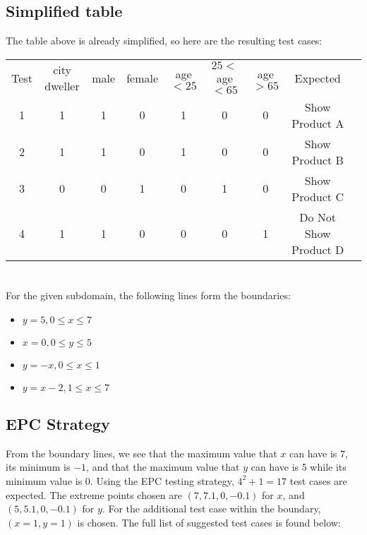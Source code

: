 \documentclass[letterpaper]{article}
\begin{document}
\subsection{Simplified table}
The table above is already simplified, so here are the resulting test cases:
\vspace{20pt}
\begin{adjustbox}{center}
	\begin{tabular}{ccccccccc}
		Test & city dweller & male & female & age $<25$ & $25<$ age $<65$ & age $>65$ & Expected              \\ \cline{1-1} \cline{8-8}
		1    & 1            & 1    & 0      & 1         & 0               & 0         & Show Product A        \\
		2    & 1            & 1    & 0      & 1         & 0               & 0         & Show Product B        \\
		3    & 0            & 0    & 1      & 0         & 1               & 0         & Show Product C        \\
		4    & 1            & 1    & 0      & 0         & 0               & 1         & Do Not Show Product D \\
	\end{tabular}
	\end{adjustbox} 

\section{}
For the given subdomain, the following lines form the boundaries:
\begin{itemize}
	\item $y=5, 0\leq x\leq 7$
	\item $x=0, 0\leq y \leq 5$
	\item $y=-x, 0\leq x\leq 1$
	\item $y=x-2, 1\leq x \leq 7$
\end{itemize}

\subsection{EPC Strategy}
From the boundary lines, we see that the maximum value that $x$ can have is
$7$, its minimum is $-1$, and that the maximum value that $y$ can have is
5 while its minimum value is 0. Using the EPC testing strategy,
$4^2 + 1=17$ test cases are expected. The extreme points chosen are
$(7, 7.1, 0, -0.1)$ for $x$, and $(5, 5.1, 0, -0.1)$ for $y$.
For the additional test case within the boundary, $(x=1, y=1)$ is chosen.
The full list of suggested test cases is found below:
\end{document}
